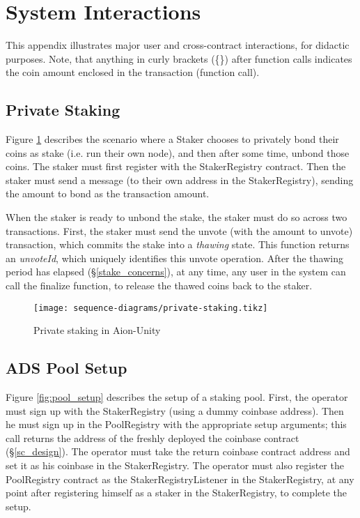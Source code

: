 \section{System Interactions}

This appendix illustrates major user and cross-contract interactions, for didactic purposes. Note, that anything in curly brackets (\{\}) after function calls indicates the coin amount enclosed in the transaction (function call).

\label{appendix:sequence_diagrams}

\subsection{Private Staking}
Figure \ref{fig:priv_staking} describes the scenario where a Staker chooses to privately bond their coins as stake (i.e. run their own node), and then after some time, unbond those coins. The staker must first register with the StakerRegistry contract. Then the staker must send a  message (to their own address in the StakerRegistry), sending the amount to bond as the transaction amount. 

When the staker is ready to unbond the stake, the staker must do so across two transactions. First, the staker must send the unvote (with the amount to unvote) transaction, which commits the stake into a \textit{thawing} state. This function returns an \textit{unvoteId}, which uniquely identifies this unvote operation. After the thawing period has elapsed (\S\ref{stake_concerns}), at any time, any user in the system can call the finalize function, to release the thawed coins back to the staker. 

\begin{figure}[ht]
\centering
\texttt{[image: sequence-diagrams/private-staking.tikz]}
\caption{Private staking in Aion-Unity}
\label{fig:priv_staking}
\end{figure}
\clearpage

\subsection{ADS Pool Setup}
Figure \ref{fig:pool_setup} describes the setup of a staking pool. First, the operator must sign up with the StakerRegistry (using a dummy coinbase address). Then he must sign up in the PoolRegistry with the appropriate setup arguments; this call returns the address of the freshly deployed the coinbase contract (\S\ref{sc_design}). The operator must take the return coinbase contract address and set it as his coinbase in the StakerRegistry. The operator must also register the PoolRegistry contract as the StakerRegistryListener in the StakerRegistry, at any point after registering himself as a staker in the StakerRegistry, to complete the setup. 

